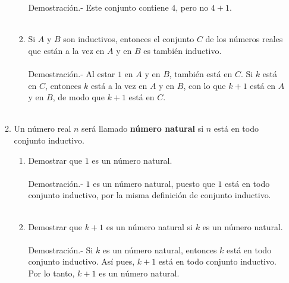 \begin{enumerate}[\bfseries 1.]
\begin{enumerate}[\bfseries (a)]
\begin{enumerate}[\bfseries (i)]
                      Demostración.-\; Este conjunto contiene $4$, pero no $4+1$.\\\\
                   \item Si $A$ y $B$ son inductivos, entonces el conjunto $C$ de los números reales que están a la vez en $A$ y en $B$ es también inductivo.\\\\
                      Demostración.-\; Al estar $1$ en $A$ y en $B$, también está en $C$. Si $k$ está en $C$, entonces $k$ está a la vez en $A$ y en $B$, con lo que $k+1$ está en $A$ y en $B$, de modo que $k+1$ está en $C$.\\\\
                \end{enumerate}

             \item Un número real $n$ será llamado \textbf{número natural} si $n$ está en todo conjunto inductivo.
                \begin{enumerate}[\bfseries (i)]
                   \item Demostrar que $1$ es un número natural.\\\\
                      Demostración.-\; $1$ es un número natural, puesto que $1$ está en todo conjunto inductivo, por la misma definición de conjunto inductivo.\\\\

                   \item Demostrar que $k+1$ es un  número natural si $k$ es un número natural.\\\\
                      Demostración.-\; Si $k$ es un número natural, entonces $k$ está en todo conjunto inductivo. Así pues, $k+1$ está en todo conjunto inductivo. Por lo tanto, $k+1$ es un número natural.\\\\
                \end{enumerate}
          \end{enumerate}


\end{enumerate}
